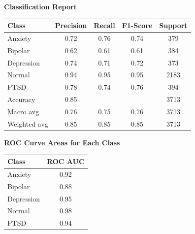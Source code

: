 \begin{center}
    \textbf{Classification Report} \\[0.5em]
    \begin{tabular}{|l|c|c|c|c|}
        \hline
        \textbf{Class}  & \textbf{Precision}  & \textbf{Recall} & \textbf{F1-Score} & \textbf{Support} \\ \hline
        Anxiety         & 0.72                & 0.76            & 0.74              & 379             \\ \hline
        Bipolar         & 0.62                & 0.61            & 0.61              & 384             \\ \hline
        Depression      & 0.74                & 0.71            & 0.72              & 373             \\ \hline
        Normal          & 0.94                & 0.95            & 0.95              & 2183            \\ \hline
        PTSD            & 0.78                & 0.74            & 0.76              & 394             \\ \hline
        Accuracy        & 0.85                &                 &                   & 3713            \\ \hline
        Macro avg       & 0.76                & 0.75            & 0.76              & 3713            \\ \hline
        Weighted avg    & 0.85                & 0.85            & 0.85              & 3713            \\ \hline
    \end{tabular}
\end{center}

\begin{center}
    \textbf{ROC Curve Areas for Each Class} \\[0.5em]
    \begin{tabular}{|l|c|}
        \hline
        \textbf{Class}  & \textbf{ROC AUC} \\ \hline
        Anxiety         & 0.92            \\ \hline
        Bipolar         & 0.88            \\ \hline
        Depression      & 0.95            \\ \hline
        Normal          & 0.98            \\ \hline
        PTSD            & 0.94            \\ \hline
    \end{tabular}
\end{center}

